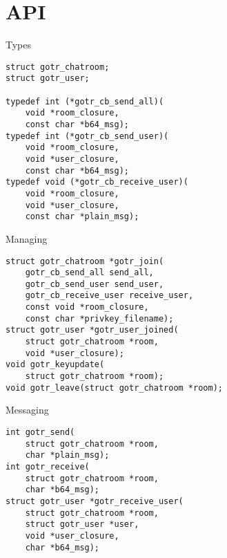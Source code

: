 \section{API}
\lstset{language=C}
\begin{frame}[fragile]{Types}
	\begin{lstlisting}
struct gotr_chatroom;
struct gotr_user;

typedef int (*gotr_cb_send_all)(
    void *room_closure,
    const char *b64_msg);
typedef int (*gotr_cb_send_user)(
    void *room_closure,
    void *user_closure,
    const char *b64_msg);
typedef void (*gotr_cb_receive_user)(
    void *room_closure,
    void *user_closure,
    const char *plain_msg);
	\end{lstlisting}
\end{frame}

\begin{frame}[fragile]{Managing}
	\begin{lstlisting}
struct gotr_chatroom *gotr_join(
    gotr_cb_send_all send_all,
    gotr_cb_send_user send_user,
    gotr_cb_receive_user receive_user,
    const void *room_closure,
    const char *privkey_filename);
struct gotr_user *gotr_user_joined(
    struct gotr_chatroom *room,
    void *user_closure);
void gotr_keyupdate(
    struct gotr_chatroom *room);
void gotr_leave(struct gotr_chatroom *room);
	\end{lstlisting}
\end{frame}

\begin{frame}[fragile]{Messaging}
	\begin{lstlisting}
int gotr_send(
    struct gotr_chatroom *room,
    char *plain_msg);
int gotr_receive(
    struct gotr_chatroom *room,
    char *b64_msg);
struct gotr_user *gotr_receive_user(
    struct gotr_chatroom *room,
    struct gotr_user *user,
    void *user_closure,
    char *b64_msg);
	\end{lstlisting}
\end{frame}
